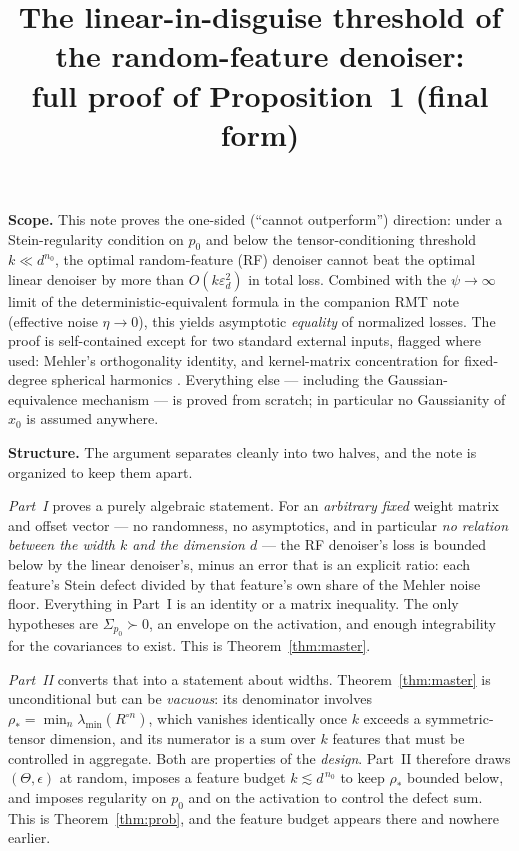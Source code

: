 \documentclass[11pt]{article}
\title{The linear-in-disguise threshold of the random-feature denoiser:\\ full proof of Proposition~1 (final form)}
\author{}
\date{}
\theoremstyle{remark}
\newcommand{\Sig}{\Sigma_{p_0}}
\newcommand{\lmin}{\lambda_{\min}}
\begin{document}
\maketitle

\noindent\textbf{Scope.} This note proves the one-sided (``cannot outperform'') direction: under a Stein-regularity condition on $p_0$ and below the tensor-conditioning threshold $k \ll d^{n_0}$, the optimal random-feature (RF) denoiser cannot beat the optimal linear denoiser by more than $O(k\varepsilon_d^2)$ in total loss. Combined with the $\psi \to \infty$ limit of the deterministic-equivalent formula in the companion RMT note (effective noise $\eta \to 0$), this yields asymptotic \emph{equality} of normalized losses. The proof is self-contained except for two standard external inputs, flagged where used: Mehler's orthogonality identity, and kernel-matrix concentration for fixed-degree spherical harmonics \cite{MMM21,MZ22}. Everything else --- including the Gaussian-equivalence mechanism --- is proved from scratch; in particular no Gaussianity of $x_0$ is assumed anywhere.

\medskip
\noindent\textbf{Structure.} The argument separates cleanly into two halves, and the note is organized to keep them apart.

\emph{Part~I} proves a purely algebraic statement. For an \emph{arbitrary fixed} weight matrix and offset vector --- no randomness, no asymptotics, and in particular \emph{no relation between the width $k$ and the dimension $d$} --- the RF denoiser's loss is bounded below by the linear denoiser's, minus an error that is an explicit ratio: each feature's Stein defect divided by that feature's own share of the Mehler noise floor. Everything in Part~I is an identity or a matrix inequality. The only hypotheses are $\Sig \succ 0$, an envelope on the activation, and enough integrability for the covariances to exist. This is Theorem~\ref{thm:master}.

\emph{Part~II} converts that into a statement about widths. Theorem~\ref{thm:master} is unconditional but can be \emph{vacuous}: its denominator involves $\rho_* = \min_n\lmin(R^{\circ n})$, which vanishes identically once $k$ exceeds a symmetric-tensor dimension, and its numerator is a sum over $k$ features that must be controlled in aggregate. Both are properties of the \emph{design}. Part~II therefore draws $(\Theta,\epsilon)$ at random, imposes a feature budget $k \lesssim d^{\,n_0}$ to keep $\rho_*$ bounded below, and imposes regularity on $p_0$ and on the activation to control the defect sum. This is Theorem~\ref{thm:prob}, and the feature budget appears there and nowhere earlier.
\end{document}
